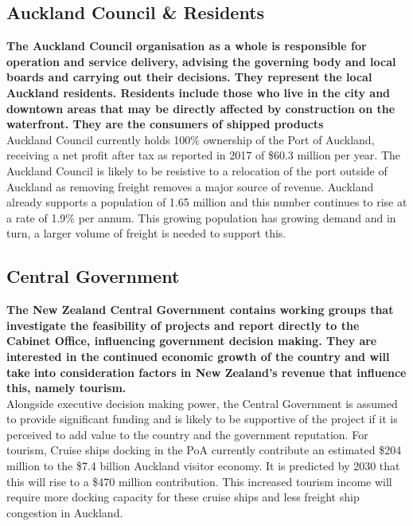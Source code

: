 \begin{multicols}{2}
\subsection*{Auckland Council \& Residents} %
    \textbf{The Auckland Council organisation as a whole is responsible for operation and service delivery, advising the governing body and local boards and carrying out their decisions. They represent the local Auckland residents. Residents include those who live in  the city and downtown areas that may be directly affected by construction on the waterfront. They are the consumers of shipped products}
    \\Auckland Council currently holds 100\% ownership of the Port of Auckland, receiving a net profit after tax as reported in 2017 of \$60.3 million per year. The Auckland Council is likely to be resistive to a relocation of the port outside of Auckland as removing freight removes a major source of revenue. Auckland already supports a population of 1.65 million and this number continues to rise at a rate of 1.9\% per annum. This growing population has growing demand and in turn, a larger volume of freight is needed to support this.
\subsection*{Central Government}
    \textbf{The New Zealand Central Government contains working groups that investigate the feasibility of projects and report directly to the Cabinet Office, influencing government decision making. They are interested in the continued economic growth of the country and will take into consideration factors in New Zealand’s revenue that influence this, namely tourism.}
    \\Alongside executive decision making power, the Central Government is assumed to provide significant funding and is likely to be supportive of the project if it is perceived to add value to the country and the government reputation. For tourism, Cruise ships docking in the PoA currently contribute an estimated \$204 million to the \$7.4 billion Auckland visitor economy. It is predicted by 2030 that this will rise to a \$470 million contribution. This increased tourism income will require more docking capacity for these cruise ships and less freight ship congestion in Auckland.

\end{multicols}
